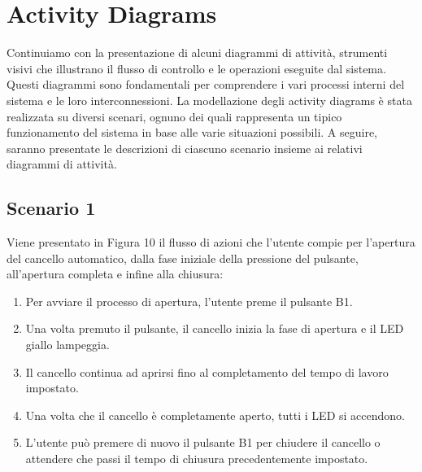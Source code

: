 \documentclass[12pt]{article}
\begin{document}
\newpage
\section{Activity Diagrams}
Continuiamo con la presentazione di alcuni diagrammi di attività, strumenti visivi che illustrano il flusso di controllo e le operazioni eseguite dal sistema. Questi diagrammi sono fondamentali per comprendere i vari processi interni del sistema e le loro interconnessioni.
La modellazione degli activity diagrams è stata realizzata su diversi scenari, ognuno dei quali rappresenta un tipico funzionamento del sistema in base alle varie situazioni possibili. A seguire, saranno presentate le descrizioni di ciascuno scenario insieme ai relativi diagrammi di attività.

\subsection{Scenario 1}
Viene presentato in Figura 10 il flusso di azioni che l’utente compie per l’apertura del cancello automatico, dalla fase iniziale della pressione del pulsante, all’apertura completa e infine alla chiusura:

\begin{enumerate}
    \item Per avviare il processo di apertura, l’utente preme il pulsante B1.
    \item Una volta premuto il pulsante, il cancello inizia la fase di apertura e il LED giallo lampeggia.
    \item Il cancello continua ad aprirsi fino al completamento del tempo di lavoro impostato.
    \item Una volta che il cancello è completamente aperto, tutti i LED si accendono.
    \item L'utente può premere di nuovo il pulsante B1 per chiudere il cancello o attendere che passi il tempo di chiusura precedentemente impostato.
\end{enumerate}
\end{document}
